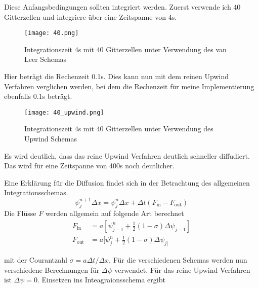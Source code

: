 \documentclass[12pt]{article}
\begin{document}
Diese Anfangsbedingungen sollten integriert werden. Zuerst verwende ich 40 Gitterzellen und integriere über eine Zeitspanne von 4s.

\begin{figure}[H]\centering\texttt{[image: 40.png]}\caption{Integrationszeit 4s mit 40 Gitterzellen unter Verwendung des van Leer Schemas}\end{figure}

Hier beträgt die Rechenzeit 0.1s. Dies kann nun mit dem reinen Upwind Verfahren verglichen werden, bei dem die Rechenzeit für meine Implementierung ebenfalls 0.1s beträgt.

\begin{figure}[H]\centering\texttt{[image: 40\_upwind.png]}\caption{Integrationszeit 4s mit 40 Gitterzellen unter Verwendung des Upwind Schemas}\end{figure}

Es wird deutlich, dass das reine Upwind Verfahren deutlich schneller diffudiert. Das wird für eine Zeitspanne von 400s noch deutlicher.

Eine Erklärung für die Diffusion findet sich in der Betrachtung des allgemeinen Integrationsschemas. 
$$\psi^{n+1}_j\Delta{x}=\psi^n_j\Delta{x}+\Delta{t}(F_\text{in}-F_\text{out})$$
Die Flüsse $F$ werden allgemein auf folgende Art berechnet
\begin{align*}F_\text{in}&=a[\psi^n_{j-1}+\frac{1}{2}(1-\sigma)\Delta\psi_{j-1}]\\
F_\text{out}&=a[\psi^n_{j}+\frac{1}{2}(1-\sigma)\Delta\psi_{j]}\end{align*}


mit der Courantzahl $\sigma=a\Delta{t}/\Delta{x}$. Für die verschiedenen Schemas werden nun verschiedene Berechnungen für $\Delta\psi$ verwendet. Für das reine Upwind Verfahren ist $\Delta\psi=0$. Einsetzen ins Inteagraionsschema ergibt
\end{document}
